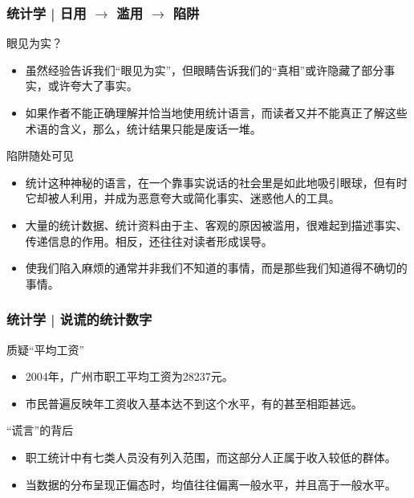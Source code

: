 \begin{frame}
  \frametitle{统计学 | 日用 $\rightarrow$ 滥用 $\rightarrow$ 陷阱}
  \begin{block}{眼见为实？}
    \begin{itemize}
      \item 虽然经验告诉我们“眼见为实”，但眼睛告诉我们的“真相”或许隐藏了部分事实，或许夸大了事实。
      \item 如果作者不能正确理解并恰当地使用统计语言，而读者又并不能真正了解这些术语的含义，那么，统计结果只能是废话一堆。
    \end{itemize}
  \end{block}
  \pause
  \begin{block}{陷阱随处可见}
    \begin{itemize}
      \item 统计这种神秘的语言，在一个靠事实说话的社会里是如此地吸引眼球，但有时它却被人利用，并成为恶意夸大或简化事实、迷惑他人的工具。
      \item 大量的统计数据、统计资料由于主、客观的原因被滥用，很难起到描述事实、传递信息的作用。相反，还往往对读者形成误导。
      \item 使我们陷入麻烦的通常并非我们不知道的事情，而是那些我们知道得不确切的事情。
    \end{itemize}
  \end{block}
\end{frame}

\begin{frame}
  \frametitle{统计学 | 说谎的统计数字}
  \begin{block}{质疑“平均工资”}
    \begin{itemize}
      \item 2004年，广州市职工平均工资为28237元。
      \item 市民普遍反映年工资收入基本达不到这个水平，有的甚至相距甚远。
    \end{itemize}
  \end{block}
  \pause \pause \pause \pause
  \begin{block}{“谎言”的背后}
    \begin{itemize}
      \item 职工统计中有七类人员没有列入范围，而这部分人正属于收入较低的群体。
      \item 当数据的分布呈现正偏态时，均值往往偏离一般水平，并且高于一般水平。
    \end{itemize}
  \end{block}
\end{frame}

